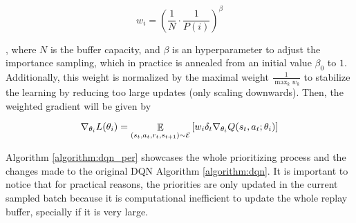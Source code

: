 \begin{equation}
    w_i = \left(\frac{1}{N} \cdot \frac{1}{P(i)} \right)^\beta
\end{equation}

, where $N$ is the buffer capacity, and $\beta$ is an hyperparameter to adjust the importance sampling, which in practice is annealed from an initial value $\beta_0$ to $1$. Additionally, this weight is normalized by the maximal weight $\frac{1}{\max_k w_k}$ to stabilize the learning by reducing too large updates (only scaling downwards). Then, the weighted gradient will be given by

\begin{equation}
    \nabla_{\theta_i} L(\theta_i) = \mathop{\mathbb{E}}\limits_{(s_t, a_t, r_t, s_{t+1}) \sim \mathcal{E}}\left[ w_i \delta_t \nabla_{\theta_i}Q(s_t, a_t; \theta_i)\right] 
\end{equation}

Algorithm \ref{algorithm:dqn_per} showcases the whole prioritizing process and the changes made to the original DQN Algorithm \ref{algorithm:dqn}. It is important to notice that for practical reasons, the priorities are only updated in the current sampled batch because it is computational inefficient to update the whole replay buffer, specially if it is very large. 


